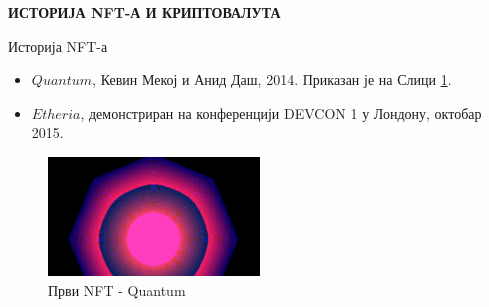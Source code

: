 \documentclass{beamer}
\begin{document}
\begin{frame}
{\large\textbf{ИСТОРИЈА NFT-А И КРИПТОВАЛУТА}}
\begin{center}
\textcolor[rgb]{0,0,0.55}{\colorbox[rgb]{0,0,1}{\textcolor[rgb]{1,1,1}{Историја NFT-а}}}
\end{center}
\begin{itemize}
\begin{itemize}
	\item \(Quantum\), Кевин Мекој и Анид Даш, 2014. Приказан је на Слици \ref{fig:abc}.
 \item \(Etheria\), демонстриран на конференцији DEVCON 1 у Лондону, октобар 2015.
\end{itemize}
\end{itemize} 
\begin{figure}
	\centering
		\includegraphics[width=0.5\textwidth]{Quantum.jpeg}
  \caption{Први NFT - Quantum}
	\label{fig:abc}
\end{figure}

\end{frame}
\end{document}
